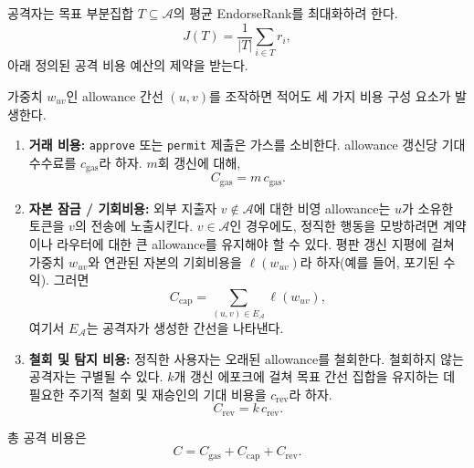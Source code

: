 공격자는 목표 부분집합 $T\subseteq\mathcal{A}$의 평균 EndorseRank를 최대화하려 한다.
\begin{equation}
\label{eq:objective}
J(T) = \frac{1}{|T|}\sum_{i\in T} r_i,
\end{equation}
아래 정의된 공격 비용 예산의 제약을 받는다.


가중치 $w_{uv}$인 allowance 간선 $(u,v)$를 조작하면 적어도 세 가지 비용 구성 요소가 발생한다.

\begin{enumerate}
\item \textbf{거래 비용:} \texttt{approve} 또는 \texttt{permit} 제출은 가스를 소비한다. allowance 갱신당 기대 수수료를 $c_{\mathrm{gas}}$라 하자. $m$회 갱신에 대해,
\begin{equation}
C_{\mathrm{gas}} = m\, c_{\mathrm{gas}}.
\end{equation}

\item \textbf{자본 잠금 / 기회비용:} 외부 지출자 $v\notin\mathcal{A}$에 대한 비영 allowance는 $u$가 소유한 토큰을 $v$의 전송에 노출시킨다. $v\in\mathcal{A}$인 경우에도, 정직한 행동을 모방하려면 계약이나 라우터에 대한 큰 allowance를 유지해야 할 수 있다. 평판 갱신 지평에 걸쳐 가중치 $w_{uv}$와 연관된 자본의 기회비용을 $\ell(w_{uv})$라 하자(예를 들어, 포기된 수익). 그러면
\begin{equation}
C_{\mathrm{cap}} = \sum_{(u,v)\in E_{\mathcal{A}}} \ell(w_{uv}),
\end{equation}
여기서 $E_{\mathcal{A}}$는 공격자가 생성한 간선을 나타낸다.

\item \textbf{철회 및 탐지 비용:} 정직한 사용자는 오래된 allowance를 철회한다. 철회하지 않는 공격자는 구별될 수 있다. $k$개 갱신 에포크에 걸쳐 목표 간선 집합을 유지하는 데 필요한 주기적 철회 및 재승인의 기대 비용을 $c_{\mathrm{rev}}$라 하자.
\begin{equation}
C_{\mathrm{rev}} = k\, c_{\mathrm{rev}}.
\end{equation}
\end{enumerate}

총 공격 비용은
\begin{equation}
\label{eq:total-cost}
C = C_{\mathrm{gas}} + C_{\mathrm{cap}} + C_{\mathrm{rev}}.
\end{equation}


